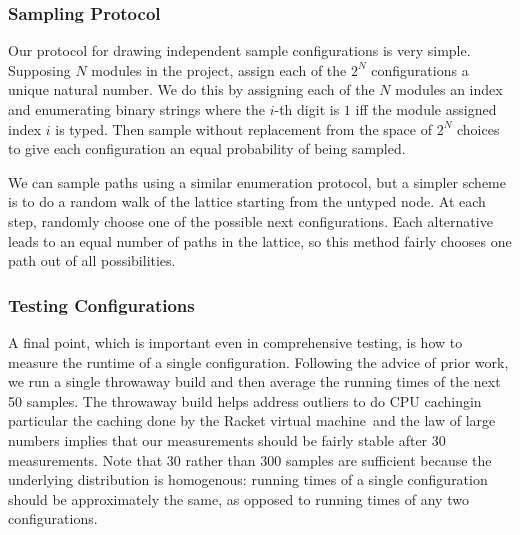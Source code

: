 \documentclass{article}
\begin{document}
\subsubsection{Sampling Protocol}
Our protocol for drawing independent sample configurations is very simple.
Supposing $N$ modules in the project, assign each of the $2^N$ configurations a unique natural number.
We do this by assigning each of the $N$ modules an index and enumerating binary strings where the $i$-th digit is $1$ iff the module assigned index $i$ is typed.
Then sample without replacement from the space of $2^N$ choices to give each configuration an equal probability of being sampled.

We can sample paths using a similar enumeration protocol, but a simpler scheme is to do a random walk of the lattice starting from the untyped node.
At each step, randomly choose one of the possible next configurations.
Each alternative leads to an equal number of paths in the lattice, so this method fairly chooses one path out of all possibilities.

\subsubsection{Testing Configurations}
A final point, which is important even in comprehensive testing, is how to measure the runtime of a single configuration.
Following the advice of prior work, we run a single throwaway build and then average the running times of the next 50 samples.
The throwaway build helps address outliers to do CPU caching\textemdash in particular the caching done by the Racket virtual machine~\cite{todo}\textemdash and the law of large numbers implies that our measurements should be fairly stable after 30 measurements.
Note that 30 rather than 300 samples are sufficient because the underlying distribution is homogenous: running times of a single configuration should be approximately the same, as opposed to running times of any two configurations.
\end{document}
